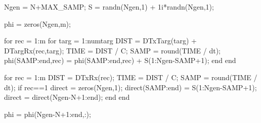 \documentclass[12pt,openany,a4paper]{book}
\begin{document}
\begin{spverbatim}
Ngen = N+MAX_SAMP;
S = randn(Ngen,1) + 1i*randn(Ngen,1);

phi = zeros(Ngen,m);

for rec = 1:m
    for targ = 1:numtarg
        DIST = DTxTarg(targ) + DTargRx(rec,targ);
        TIME = DIST / C;
        SAMP = round(TIME / dt);
        phi(SAMP:end,rec) = phi(SAMP:end,rec) + S(1:Ngen-SAMP+1);
    end
end

for rec = 1:m
    DIST = DTxRx(rec);
    TIME = DIST / C;
    SAMP = round(TIME / dt);
    if rec==1
        direct = zeros(Ngen,1);
        direct(SAMP:end) = S(1:Ngen-SAMP+1);
        direct = direct(Ngen-N+1:end);
    end
end
  
phi = phi(Ngen-N+1:end,:);
\end{spverbatim}
\end{document}
